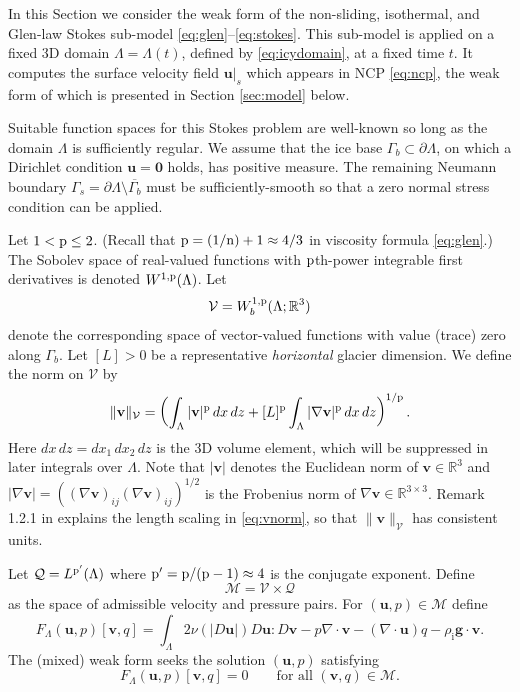 \documentclass[hidelinks,onefignum,onetabnum,final]{siamart220329}  %
\newcommand{\RR}{\mathbb{R}}
\newcommand{\grad}{\nabla}
\newcommand{\Div}{\nabla\cdot}
\newcommand{\bg}{\mathbf{g}}
\newcommand{\bu}{\mathbf{u}}
\newcommand{\bv}{\mathbf{v}}
\newcommand{\bzero}{\bm{0}}
\newcommand{\cQ}{\mathcal{Q}}
\newcommand{\cV}{\mathcal{V}}
\newcommand{\nn}{{\text{\textnormal{n}}}}
\newcommand{\pp}{{\text{\textnormal{p}}}}
\newcommand{\rhoi}{\rho_{\text{i}}}
\begin{document}
In this Section we consider the weak form of the non-sliding, isothermal, and Glen-law Stokes sub-model \eqref{eq:glen}--\eqref{eq:stokes}.  This sub-model is applied on a fixed 3D domain $\Lambda = \Lambda(t)$, defined by \eqref{eq:icydomain}, at a fixed time $t$.  It computes the surface velocity field $\bu|_s$ which appears in NCP \eqref{eq:ncp}, the weak form of which is presented in Section \ref{sec:model} below.

Suitable function spaces for this Stokes problem are well-known so long as the domain $\Lambda$ is sufficiently regular.  We assume that the ice base $\Gamma_b\subset\partial \Lambda$, on which a Dirichlet condition $\bu=\bzero$ holds, has positive measure.  The remaining Neumann boundary $\Gamma_s = \partial \Lambda \setminus \overline{\Gamma_b}$ must be sufficiently-smooth so that a zero normal stress condition can be applied.

Let $1 < \pp \le 2$.  (Recall that $\pp=(1/\nn)+1\approx 4/3$ in viscosity formula \eqref{eq:glen}.)  The Sobolev space \cite{Evans2010} of real-valued functions with $\pp$th-power integrable first derivatives is denoted $W^{1,\pp}(\Lambda)$.  Let
\begin{equation}
\cV = W_b^{1,\pp}(\Lambda; \RR^3) \label{eq:defineV}
\end{equation}
denote the corresponding space of vector-valued functions with value (trace) zero along $\Gamma_b$.  Let $[L]>0$ be a representative \emph{horizontal} glacier dimension.  We define the norm on $\cV$ by
\begin{equation}
\|\bv\|_{\cV} = \left(\int_\Lambda |\bv|^\pp\,dx\,dz + [L]^\pp \int_\Lambda |\grad\bv|^\pp\,dx\,dz\right)^{1/\pp}. \label{eq:vnorm}
\end{equation}
Here $dx\,dz = dx_1\,dx_2\,dz$ is the 3D volume element, which will be suppressed in later integrals over $\Lambda$.  Note that $|\bv|$ denotes the Euclidean norm of $\bv\in\RR^3$ and $|\grad\bv|=\left((\grad\bv)_{ij} (\grad\bv)_{ij}\right)^{1/2}$ is the Frobenius norm of $\grad\bv\in\RR^{3\times 3}$.  Remark 1.2.1 in \cite{BoffiBrezziFortin2013} explains the length scaling in \eqref{eq:vnorm}, so that $\|\bv\|_{\cV}$ has consistent units.

Let $\cQ=L^{\pp'}(\Lambda)$ where $\pp'=\pp/(\pp-1)\approx 4$ is the conjugate exponent.  Define
\begin{equation}
\mathcal{M} = \cV \times \cQ \label{eq:glenstokes:mixedspace}
\end{equation}
as the space of admissible velocity and pressure pairs.  For $(\bu,p) \in \mathcal{M}$ define
\begin{equation}
F_\Lambda(\bu,p)[\bv,q] = \int_\Lambda 2 \nu(|D\bu|) D\bu : D\bv - p \Div\bv - (\Div\bu) q - \rhoi \bg \cdot \bv. \label{eq:glenstokes:fcnl}
\end{equation}
The (mixed) weak form seeks the solution $(\bu,p)$ satisfying
\begin{equation}
F_\Lambda(\bu,p)[\bv,q] = 0 \qquad \text{for all } (\bv,q) \in \mathcal{M}. \label{eq:glenstokes:weak}
\end{equation}
\end{document}
